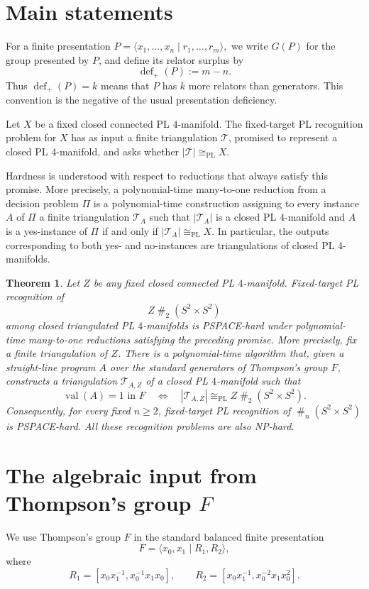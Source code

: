 \documentclass[a4paper,11pt,reqno]{amsart}
\newtheorem{theorem}{Theorem}
\theoremstyle{definition}
\theoremstyle{remark}
\DeclareMathOperator{\val}{val}
\newcommand{\PL}{\mathrm{PL}}
\newcommand{\cs}{\mathbin{\#}}
\begin{document}
	\section{Main statements}
	\label{sec:main-statements}
	
	For a finite presentation
	\(
	P=\langle x_1,\ldots,x_n\mid r_1,\ldots,r_m\rangle,
	\)
	we write $G(P)$ for the group presented by $P$, and define its relator surplus by
	\[
	\operatorname{def}_+(P):=m-n.
	\]
	Thus $\operatorname{def}_+(P)=k$ means that $P$ has $k$ more relators than generators. This convention is the negative of the usual presentation deficiency.
	
	Let $X$ be a fixed closed connected PL $4$-manifold.
	The fixed-target PL recognition problem for $X$ has as input a finite triangulation $\mathcal{T}$, promised to represent a closed PL $4$-manifold, and asks whether
	\(
	|\mathcal{T}|\cong_{\mathrm{PL}} X.
	\)
	
	Hardness is understood with respect to reductions that always satisfy this promise. More precisely, a polynomial-time many-to-one reduction from a decision problem $\Pi$ is a polynomial-time construction assigning to every instance $A$ of $\Pi$ a finite triangulation $\mathcal{T}_A$ such that $|\mathcal{T}_A|$ is a closed PL $4$-manifold and
	$A$ is a yes-instance of $\Pi$ if and only if $|\mathcal{T}_A|\cong_{\PL} X$.
	In particular, the outputs corresponding to both yes- and no-instances are triangulations of closed PL $4$-manifolds.
	
	\begin{theorem}
		\label{thm:main}
		Let $Z$ be any fixed closed connected PL $4$-manifold. Fixed-target
		PL recognition of
		\[
		Z\cs_2(S^2\times S^2)
		\]
		among closed triangulated PL $4$-manifolds is PSPACE-hard under
		polynomial-time many-to-one reductions satisfying the preceding promise.
		More precisely, fix a finite triangulation of $Z$. There is a polynomial-time algorithm that, given a straight-line program $A$ over the standard generators of Thompson’s group $F$, constructs a triangulation
		$\mathcal{T}_{A,Z}$ of a closed PL $4$-manifold such that
		\[
		\val(A)=1\text{ in }F
		\quad\Longleftrightarrow\quad
		|\mathcal{T}_{A,Z}|\cong_{\mathrm{PL}}
		Z\cs_2(S^2\times S^2).
		\]
		Consequently, for every fixed $n\geq2$, fixed-target PL recognition of
		$\cs_n(S^2\times S^2)$ is PSPACE-hard. All these recognition problems
		are also NP-hard.
	\end{theorem}
	
	\section{The algebraic input from Thompson's group \texorpdfstring{$F$}{F}}
	\label{sec:alg-input}
	We use Thompson's group $F$ in the standard balanced finite presentation
	\[
	F=\langle x_0,x_1\mid R_1,R_2\rangle,
	\]
	where
	\[
	R_1=[x_0x_1^{-1},x_0^{-1}x_1x_0],
	\qquad
	R_2=[x_0x_1^{-1},x_0^{-2}x_1x_0^2].
	\]
	
\end{document}
